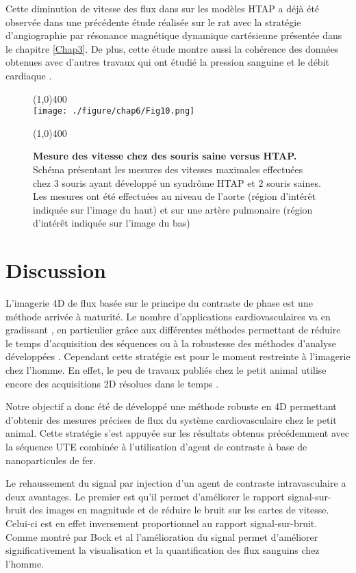 Cette diminution de vitesse des flux dans sur les modèles HTAP a déjà été observée dans une précédente étude réalisée sur le rat \cite{Dumas2011effect} avec la stratégie d'angiographie par résonance magnétique dynamique cartésienne présentée dans le chapitre \ref{Chap3}. De plus, cette étude montre aussi la cohérence des données obtenues avec d'autres travaux qui ont étudié la pression sanguine et le débit cardiaque \cite{pozeg2003vivo,hessel2006characterization}.

\begin{figure}[H]
\centering
\line(1,0){400} \\
\texttt{[image: ./figure/chap6/Fig10.png]}
\caption[Mesure des vitesse chez des souris saine versus HTAP.]{\label{fig:CarteVitesse}\textbf{Mesure des vitesse chez des souris saine versus HTAP.} Schéma présentant les mesures des vitesses maximales effectuées chez 3 souris ayant développé un syndrôme HTAP et 2 souris saines. Les mesures ont été effectuées au niveau de l'aorte (région d'intérêt indiquée sur l'image du haut) et sur une artère pulmonaire (région d'intérêt indiquée sur l'image du bas)}
\line(1,0){400} \\ 
\end{figure}

\section{Discussion}

L'imagerie 4D de flux basée sur le principe du contraste de phase est une méthode arrivée à maturité. Le nombre d'applications cardiovasculaires va en gradissant \cite{Stankovic:2014aa,Garcia:2014aa,Petersson:2015aa}, en particulier grâce aux différentes méthodes permettant de réduire le temps d'acquisition des séquences \cite{Liu:2014aa} ou à la robustesse des méthodes d'analyse développées \cite{Eriksson:2010aa}. Cependant cette stratégie est pour le moment restreinte à l'imagerie chez l'homme. En effet, le peu de travaux publiés chez le petit animal utilise encore des acquisitions 2D résolues dans le temps \cite{Zhao:2009ng}. 

Notre objectif a donc été de développé une méthode robuste en 4D permettant d’obtenir des mesures précises de flux du système cardiovasculaire chez le petit animal. Cette stratégie s’est appuyée sur les résultats obtenus précédemment avec la séquence UTE combinée à l'utilisation d'agent de contraste à base de nanoparticules de fer.

Le rehaussement du signal par injection d’un agent de contraste intravasculaire a deux avantages. Le premier est qu’il permet d’améliorer le rapport signal-sur-bruit des images en magnitude et de réduire le bruit sur les cartes de vitesse. Celui-ci est en effet inversement proportionnel au rapport signal-sur-bruit. Comme montré par Bock et al \cite{Bock:2010aa} l’amélioration du signal permet d’améliorer significativement la visualisation et la quantification des flux sanguins chez l’homme.

